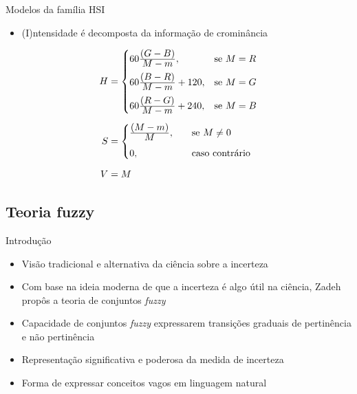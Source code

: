 \begin{frame}{Modelos da família HSI}
\begin{itemize}
    \item  (I)ntensidade é decomposta da informação de crominância
\end{itemize}
\begin{align*}
\begin{split}
  H &=  \begin{cases}
            60\frac{\displaystyle (G - B)}{\displaystyle M - m}, & \text{se}\ M = R\\[0.7em]
            60\frac{\displaystyle (B - R)}{\displaystyle M - m} + 120, & \text{se}\ M = G\\[0.7em]
            60\frac{\displaystyle (R - G)}{\displaystyle M - m} + 240, & \text{se}\ M = B
       \end{cases}
  \\[0.5em]
  S &=  \begin{cases}
            \frac{\displaystyle (M - m)}{\displaystyle M}, \quad &\text{se}\ M \neq 0\\[0.7em]
            0, \quad &\text{caso contrário}\\
       \end{cases}
  \\[0.5em]
  V &= M
\end{split}
\end{align*}
\end{frame}

\subsection{Teoria fuzzy}
\begin{frame}{Introdução}
\begin{itemize}
    \item Visão tradicional e alternativa da ciência sobre a incerteza \citep{klir:95}
    \item Com base na ideia moderna de que a incerteza é algo útil na ciência, Zadeh propôs a teoria de conjuntos \emph{fuzzy}
    \item Capacidade de conjuntos \emph{fuzzy} expressarem transições graduais de pertinência e não pertinência
    \item Representação significativa e poderosa da medida de incerteza
    \item Forma de expressar conceitos vagos em linguagem natural
\end{itemize}
\end{frame}

